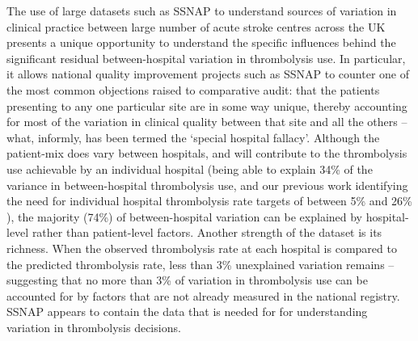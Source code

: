 The use of large datasets such as SSNAP to understand sources of variation in clinical practice between large number of acute stroke centres across the UK presents a unique opportunity to understand the specific influences behind the significant residual between-hospital variation in thrombolysis use. In particular, it allows national quality improvement projects such as SSNAP to counter one of the most common objections raised to comparative audit: that the patients presenting to any one particular site are in some way unique, thereby accounting for most of the variation in clinical quality between that site and all the others – what, informly, has been termed the `special hospital fallacy'. Although the patient-mix does vary between hospitals, and will contribute to the thrombolysis use achievable by an individual hospital (being able to explain 34\% of the variance in between-hospital thrombolysis use, and our previous work identifying the need for individual hospital thrombolysis rate targets of between 5\% and 26\% \cite{allen_use_2022}), the majority (74\%) of between-hospital variation can be explained by hospital-level rather than patient-level factors. Another strength of the dataset is its richness. When the observed thrombolysis rate at each hospital is compared to the predicted thrombolysis rate, less than 3\% unexplained variation remains – suggesting that no more than 3\% of variation in thrombolysis use can be accounted for by factors that are not already measured in the national registry. SSNAP appears to contain the data that is needed for for understanding variation in thrombolysis decisions. 

